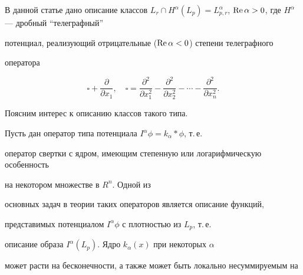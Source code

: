 \date{}




\pagestyle{plain} %







\maketitle


\label{begin}








В данной статье дано описание классов $L_r\cap H^{\alpha}(L_p)=


L_{p,r}^{\alpha}$, $\R\alpha>0$, где $H^\alpha$ --- дробный ``телеграфный''


потенциал, реализующий отрицательные ($\operatorname{Re}\alpha<0$) степени телеграфного


оператора


\begin{equation}


\square + \frac{\partial}{\partial x_1},\quad


\square =\frac{{\partial}^2}{\partial


x_1^2} - \frac{{\partial}^2}{\partial x_2^2} -\dotsb- \frac{{\partial}^2}


{\partial x_n^2}.


\end{equation}


Поясним интерес к описанию классов такого типа.





Пусть дан оператор типа потенциала $I^\alpha\phi=k_\alpha*\phi$, т.\,е.


оператор свертки с ядром, имеющим степенную или логарифмическую особенность


на некотором множестве в $R^n$. Одной из


основных задач в теории таких операторов является описание функций,


представимых потенциалом $I^\alpha\phi$ с плотностью из $L_p$, т.\,е.


описание образа $I^\alpha(L_p)$. Ядро $k_\alpha(x)$ при некоторых $\alpha$


может расти на бесконечности, а также может быть локально несуммируемым на


